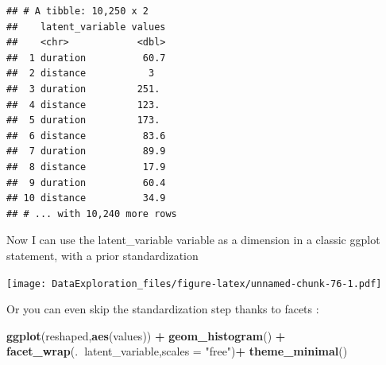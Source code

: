 \documentclass[
]{book}
\newenvironment{Shaded}{\begin{snugshade}}{\end{snugshade}}
\newcommand{\DataTypeTok}[1]{\textcolor[rgb]{0.13,0.29,0.53}{#1}}
\newcommand{\KeywordTok}[1]{\textcolor[rgb]{0.13,0.29,0.53}{\textbf{#1}}}
\newcommand{\NormalTok}[1]{#1}
\newcommand{\OperatorTok}[1]{\textcolor[rgb]{0.81,0.36,0.00}{\textbf{#1}}}
\newcommand{\StringTok}[1]{\textcolor[rgb]{0.31,0.60,0.02}{#1}}
\begin{document}
\begin{Shaded}
\end{Shaded}

\begin{verbatim}
## # A tibble: 10,250 x 2
##    latent_variable values
##    <chr>            <dbl>
##  1 duration          60.7
##  2 distance           3  
##  3 duration         251. 
##  4 distance         123. 
##  5 duration         173. 
##  6 distance          83.6
##  7 duration          89.9
##  8 distance          17.9
##  9 duration          60.4
## 10 distance          34.9
## # ... with 10,240 more rows
\end{verbatim}

Now I can use the latent\_variable variable as a dimension in a classic ggplot statement, with a prior standardization

\begin{Shaded}
\end{Shaded}

\texttt{[image: DataExploration\_files/figure-latex/unnamed-chunk-76-1.pdf]}

Or you can even skip the standardization step thanks to facets :

\begin{Shaded}
\begin{Highlighting}[]
\KeywordTok{ggplot}\NormalTok{(reshaped,}\KeywordTok{aes}\NormalTok{(values)) }\OperatorTok{+}\StringTok{ }\KeywordTok{geom_histogram}\NormalTok{() }\OperatorTok{+}\StringTok{ }
\StringTok{  }\KeywordTok{facet_wrap}\NormalTok{(.}\OperatorTok{~}\NormalTok{latent_variable,}\DataTypeTok{scales =} \StringTok{"free"}\NormalTok{)}\OperatorTok{+}
\StringTok{  }\KeywordTok{theme_minimal}\NormalTok{()}
\end{Highlighting}
\end{Shaded}
\end{document}
